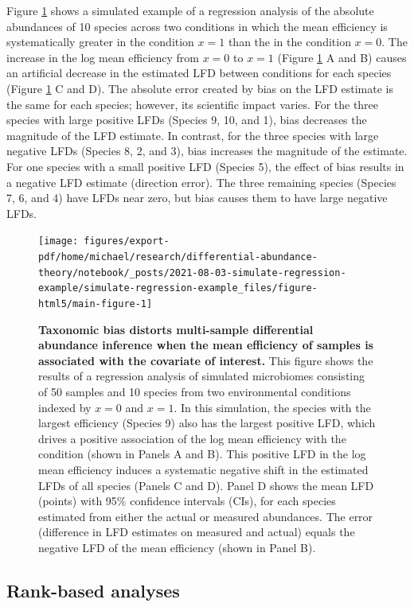 \documentclass[
]{article}
\begin{document}
Figure \ref{fig:regression-example} shows a simulated example of a regression analysis of the absolute abundances of 10 species across two conditions in which the mean efficiency is systematically greater in the condition \(x=1\) than the in the condition \(x=0\).
The increase in the log mean efficiency from \(x=0\) to \(x=1\) (Figure \ref{fig:regression-example} A and B) causes an artificial decrease in the estimated LFD between conditions for each species (Figure \ref{fig:regression-example} C and D).
The absolute error created by bias on the LFD estimate is the same for each species; however, its scientific impact varies.
For the three species with large positive LFDs (Species 9, 10, and 1), bias decreases the magnitude of the LFD estimate.
In contrast, for the three species with large negative LFDs (Species 8, 2, and 3), bias increases the magnitude of the estimate.
For one species with a small positive LFD (Species 5), the effect of bias results in a negative LFD estimate (direction error).
The three remaining species (Species 7, 6, and 4) have LFDs near zero, but bias causes them to have large negative LFDs.

\begin{figure}
\texttt{[image: figures/export-pdf/home/michael/research/differential-abundance-theory/notebook/\_posts/2021-08-03-simulate-regression-example/simulate-regression-example\_files/figure-html5/main-figure-1]} \caption{\textbf{Taxonomic bias distorts multi-sample differential abundance inference when the mean efficiency of samples is associated with the covariate of interest.} This figure shows the results of a regression analysis of simulated microbiomes consisting of 50 samples and 10 species from two environmental conditions indexed by \(x=0\) and \(x=1\). In this simulation, the species with the largest efficiency (Species 9) also has the largest positive LFD, which drives a positive association of the log mean efficiency with the condition (shown in Panels A and B). This positive LFD in the log mean efficiency induces a systematic negative shift in the estimated LFDs of all species (Panels C and D). Panel D shows the mean LFD (points) with 95\% confidence intervals (CIs), for each species estimated from either the actual or measured abundances. The error (difference in LFD estimates on measured and actual) equals the negative LFD of the mean efficiency (shown in Panel B).}\label{fig:regression-example}
\end{figure}



\hypertarget{rank-based-analyses}{%
\subsection{Rank-based analyses}\label{rank-based-analyses}}
\end{document}
